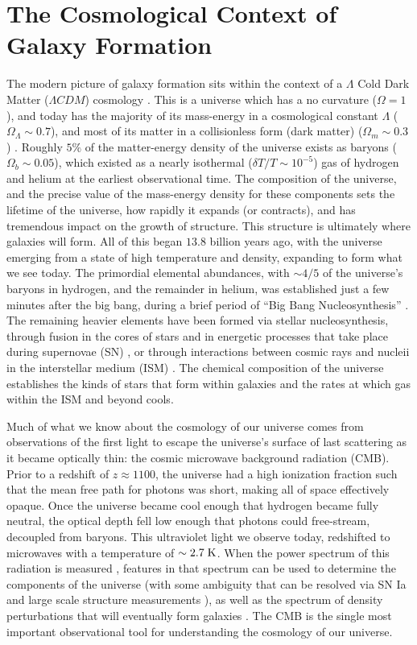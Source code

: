 \section{The Cosmological Context of Galaxy Formation}
The modern picture of galaxy formation sits within the context of a $\Lambda$
Cold Dark Matter  ($\Lambda CDM$) cosmology
\citep{Rees1977,White1978,Blumenthal1984,Mo1998}.  This is a universe which has
a no curvature ($\Omega = 1$), and today has the majority of its mass-energy in
a cosmological constant $\Lambda$ ($\Omega_\Lambda \sim 0.7$), and most of its
matter in a collisionless form (dark matter) ($\Omega_m \sim 0.3$)
\citep{Planck2014}.  Roughly $5\%$ of the matter-energy density of the universe
exists as baryons ($\Omega_b \sim 0.05$), which existed as a nearly isothermal
($\delta T/T\sim10^{-5}$) gas of hydrogen and helium at the earliest
observational time.  The composition of the universe, and the precise value of
the mass-energy density for these components sets the lifetime of the universe,
how rapidly it expands (or contracts), and has tremendous impact on the growth
of structure.  This structure is ultimately where galaxies will form. All of
this began $13.8$ billion years ago, with the universe emerging from a state of
high temperature and density, expanding to form what we see today.  The
primordial elemental abundances, with $\sim4/5$ of the universe's baryons in
hydrogen, and the remainder in helium, was established just a few minutes after
the big bang, during a brief period of ``Big Bang Nucleosynthesis''
\citep{Alpher1948}.  The remaining heavier elements have been formed via stellar
nucleosynthesis, through fusion in the cores of stars and in energetic processes
that take place during supernovae (SN) \citep{Wagoner1967}, or through
interactions between cosmic rays and nucleii in the interstellar medium (ISM)
\citep{Reeves1970}.  The chemical composition of the universe establishes the
kinds of stars that form within galaxies and the rates at which gas within the
ISM and beyond cools.

Much of what we know about the cosmology of our universe comes from observations
of the first light to escape the universe's surface of last scattering as it
became optically thin: the cosmic microwave background radiation (CMB).  Prior
to a redshift of $z\approx1100$, the universe had a high ionization fraction
such that the mean free path for photons was short, making all of space
effectively opaque.  Once the universe became cool enough that hydrogen became
fully neutral, the optical depth fell low enough that photons could free-stream,
decoupled from baryons.  This ultraviolet light we observe today, redshifted to
microwaves with a temperature of $\sim2.7\;\rm{K}$.  When the power spectrum of
this radiation is measured \citep{Spergel2003}, features in that spectrum can be
used to determine the components of the universe (with some ambiguity that can
be resolved via SN Ia and large scale structure measurements
\citealt{Riess1998,Perlmutter1999,Beutler2011,Blake2011}), as well as the
spectrum of density perturbations that will eventually form galaxies
\citep{Press1974,Peebles1980}.   The CMB is the single most important
observational tool for understanding the cosmology of our universe.

